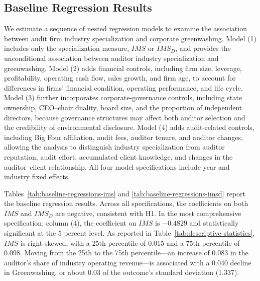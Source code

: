 \documentclass[11pt]{article}
\begin{document}
\subsection{Baseline Regression Results}

We estimate a sequence of nested regression models to examine the association between audit firm industry specialization and corporate greenwashing. 
Model (1) includes only the specialization measure, \(IMS\) or \(IMS_D\), and provides the unconditional association between auditor industry specialization and greenwashing. 
Model (2) adds financial controls, including firm size, leverage, profitability, operating cash flow, sales growth, and firm age, to account for differences in firms’ financial condition, operating performance, and life cycle. 
Model (3) further incorporates corporate-governance controls, including state ownership, CEO–chair duality, board size, and the proportion of independent directors, because governance structures may affect both auditor selection and the credibility of environmental disclosure. 
Model (4) adds audit-related controls, including Big Four affiliation, audit fees, auditor tenure, and auditor changes, allowing the analysis to distinguish industry specialization from auditor reputation, audit effort, accumulated client knowledge, and changes in the auditor–client relationship.
All four model specifications include year and industry fixed effects.

Tables~\ref{tab:baseline-regressions-ims} and \ref{tab:baseline-regressions-imsd} report the baseline regression results. 
Across all specifications, the coefficients on both \(IMS\) and \(IMS_D\) are negative, consistent with H1. 
In the most comprehensive specification, column (4), the coefficient on \(IMS\) is \(-0.4829\) and statistically significant at the 5 percent level. 
As reported in Table~\ref{tab:descriptive-statistics}, \(IMS\) is right-skewed, with a 25th percentile of 0.015 and a 75th percentile of 0.098. 
Moving from the 25th to the 75th percentile---an increase of 0.083 in the auditor’s share of industry operating revenue---is associated with a 0.040 decline in Greenwashing, or about 0.03 of the outcome’s standard deviation (1.337). 
\end{document}
